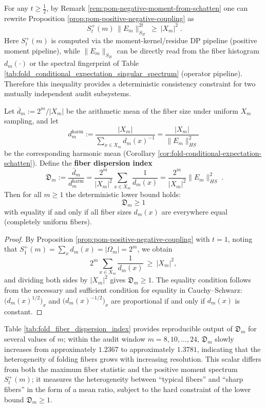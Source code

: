 \begin{remark}\label{rem:pom-positive-negative-cross-audit}
For any \(t\ge \frac12\), by Remark \ref{rem:pom-negative-moment-from-schatten} one can rewrite Proposition \ref{prop:pom-positive-negative-coupling} as
$$
\boxed{\;
S^{+}_{t}(m)\,\|E_m\|_{S_{2t}}^{2t}\ \ge\ |X_m|^2\; }.
$$
Here \(S_t^{+}(m)\) is computed via the moment-kernel/residue DP pipeline (positive moment pipeline), while \(\|E_m\|_{S_{2t}}\) can be directly read from the fiber histogram \(d_m(\cdot)\) or the spectral fingerprint of Table \ref{tab:fold_conditional_expectation_singular_spectrum} (operator pipeline).
Therefore this inequality provides a deterministic consistency constraint for two mutually independent audit subsystems.
\end{remark}

\begin{corollary}\label{cor:pom-fiber-dispersion-index}
Let \(\overline d_m:=2^m/|X_m|\) be the arithmetic mean of the fiber size under uniform \(X_m\) sampling, and let
\[
d_m^{\mathrm{harm}}
:=
\frac{|X_m|}{\sum_{x\in X_m} d_m(x)^{-1}}
=
\frac{|X_m|}{\|E_m\|_{HS}^2}
\]
be the corresponding harmonic mean (Corollary \ref{cor:fold-conditional-expectation-schatten}).
Define the \textbf{fiber dispersion index}
\[
\boxed{\;
\mathfrak{D}_m
:=
\frac{\overline d_m}{d_m^{\mathrm{harm}}}
=
\frac{2^m}{|X_m|^2}\sum_{x\in X_m}\frac{1}{d_m(x)}
=
\frac{2^m}{|X_m|^2}\|E_m\|_{HS}^2\; }.
\]
Then for all \(m\ge 1\) the deterministic lower bound holds:
\[
\boxed{\;\mathfrak{D}_m\ge 1\;}
\]
with equality if and only if all fiber sizes \(d_m(x)\) are everywhere equal (completely uniform fibers).
\end{corollary}
\begin{proof}
By Proposition \ref{prop:pom-positive-negative-coupling} with \(t=1\), noting that \(S_1^+(m)=\sum_x d_m(x)=|\Omega_m|=2^m\), we obtain
\[
2^m\sum_{x\in X_m}\frac{1}{d_m(x)}\ \ge\ |X_m|^2,
\]
and dividing both sides by \(|X_m|^2\) gives \(\mathfrak{D}_m\ge 1\).
The equality condition follows from the necessary and sufficient condition for equality in Cauchy--Schwarz: \(\bigl(d_m(x)^{1/2}\bigr)_x\) and \(\bigl(d_m(x)^{-1/2}\bigr)_x\) are proportional if and only if \(d_m(x)\) is constant.
\end{proof}


\begin{remark}\label{rem:pom-fiber-dispersion-trend}
Table \ref{tab:fold_fiber_dispersion_index} provides reproducible output of \(\mathfrak{D}_m\) for several values of \(m\); within the audit window \(m=8,10,\dots,24\), \(\mathfrak{D}_m\) slowly increases from approximately \(1.2367\) to approximately \(1.3781\), indicating that the heterogeneity of folding fibers grows with increasing resolution.
This scalar differs from both the maximum fiber statistic and the positive moment spectrum \(S_t^+(m)\);
it measures the heterogeneity between ``typical fibers'' and ``sharp fibers'' in the form of a mean ratio, subject to the hard constraint of the lower bound \(\mathfrak{D}_m\ge 1\).
\end{remark}

